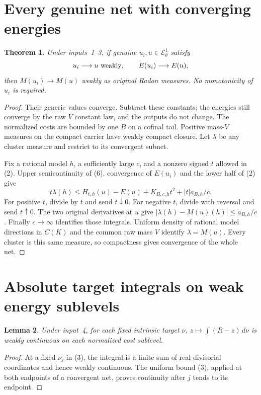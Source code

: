 \documentclass[11pt]{article}
\newtheorem{theorem}{Theorem}
\newtheorem{lemma}[theorem]{Lemma}
\newcommand{\EE}{\mathcal E^1_\theta}
\begin{document}
\section{Every genuine net with converging energies}
\begin{theorem}
Under inputs~1--3, if genuine $u_i,u\in\EE$ satisfy
\[
 u_i\longrightarrow u\ \hbox{weakly},\qquad
 E(u_i)\longrightarrow E(u),
\]
then $M(u_i)\longrightarrow M(u)$ weakly as original
Radon measures. No monotonicity of $u_i$ is required.
\end{theorem}
\begin{proof}
Their generic values converge. Subtract these constants;
the energies still converge by the raw $V$ constant law,
and the outputs do not change. The normalized costs are
bounded by one $B$ on a cofinal tail.
Positive mass-$V$ measures on the compact carrier have
weakly compact closure. Let $\lambda$ be any cluster measure
and restrict to its convergent subnet.

Fix a rational model $h$, a sufficiently large $c$, and
a nonzero signed $t$ allowed in (2). Upper semicontinuity
of (6), convergence of $E(u_i)$ and the lower half of (2)
give
\[
 t\lambda(h)\leq H_{t,h}(u)-E(u)
              +K_{B,c,h}t^2+|t|a_{B,h}/c.
\]
For positive $t$, divide by $t$ and send $t\downarrow0$.
For negative $t$, divide with reversal and send $t\uparrow0$.
The two original derivatives at $u$ give
$|\lambda(h)-M(u)(h)|\leq a_{B,h}/c$.
Finally $c\to\infty$ identifies those integrals.
Uniform density of rational model directions in $C(K)$
and the common raw mass $V$ identify $\lambda=M(u)$.
Every cluster is this same measure, so compactness gives
convergence of the whole net.
\end{proof}

\section{Absolute target integrals on weak energy sublevels}
\begin{lemma}
Under input~4, for each fixed intrinsic target $\nu$,
$z\mapsto\int(R-z)\,d\nu$ is weakly continuous on each
normalized cost sublevel.
\end{lemma}
\begin{proof}
At a fixed $\nu_j$ in (3), the integral is a finite sum
of real divisorial coordinates and hence weakly continuous.
The uniform bound (3), applied at both endpoints of a
convergent net, proves continuity after $j$ tends to its endpoint.
\end{proof}
\end{document}
